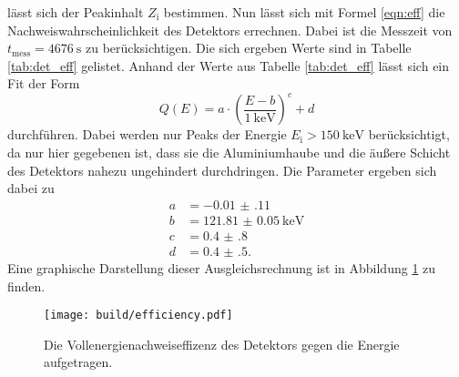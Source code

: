 lässt sich der Peakinhalt $Z_\text{i}$ bestimmen. Nun lässt sich mit Formel \ref{eqn:eff}
die Nachweiswahrscheinlichkeit des Detektors errechnen. Dabei ist die Messzeit von $t_\text{mess} = \SI{4676}{\second}$
zu berücksichtigen. Die sich ergeben Werte sind in Tabelle \ref{tab:det_eff} gelistet.
Anhand der Werte aus Tabelle \ref{tab:det_eff} lässt sich ein Fit der Form
\begin{equation}
  \label{eqn:Potenz}
  Q(E) = a \cdot \left(\frac{E-b}{\SI{1}{\kilo\electronvolt}}\right)^c + d
\end{equation}
durchführen. Dabei werden nur Peaks der Energie $E_\text{i} > \SI{150}{\kilo\electronvolt}$ berücksichtigt,
da nur hier gegebenen ist, dass sie die Aluminiumhaube und die äußere Schicht des Detektors nahezu
ungehindert durchdringen. Die Parameter ergeben sich dabei zu
\begin{align*}
  a &= \num{-0.01(11)} \\
  b &= \SI{121.81(5)}{\kilo\electronvolt} \\
  c &= \num{0.4(8)} \\
  d &= \num{0.4(5)}.
\end{align*}
Eine graphische Darstellung dieser Ausgleichsrechnung ist in Abbildung \ref{fig:effizenz} zu finden.

\begin{figure}[htb]
 \centering
 \texttt{[image: build/efficiency.pdf]}
 \caption{Die Vollenergienachweiseffizenz des Detektors gegen die Energie aufgetragen.}
 \label{fig:effizenz}
\end{figure}

\FloatBarrier


